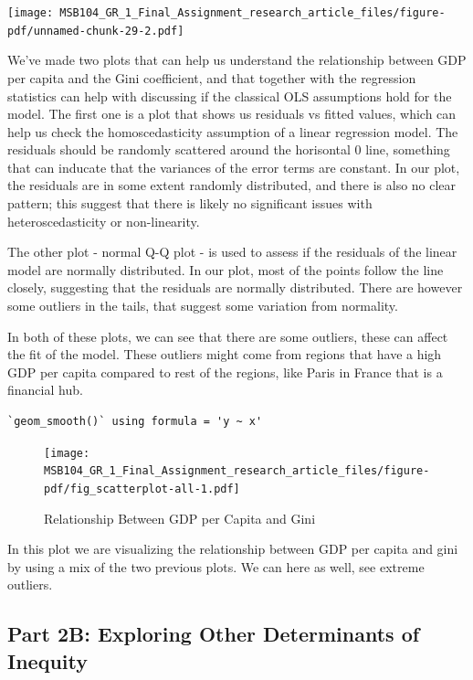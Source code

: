 \documentclass[
  a4paper,
  DIV=11,
  numbers=noendperiod]{scrartcl}
\begin{document}
\texttt{[image: MSB104\_GR\_1\_Final\_Assignment\_research\_article\_files/figure-pdf/unnamed-chunk-29-2.pdf]}

We've made two plots that can help us understand the relationship
between GDP per capita and the Gini coefficient, and that together with
the regression statistics can help with discussing if the classical OLS
assumptions hold for the model. The first one is a plot that shows us
residuals vs fitted values, which can help us check the homoscedasticity
assumption of a linear regression model. The residuals should be
randomly scattered around the horisontal 0 line, something that can
inducate that the variances of the error terms are constant. In our
plot, the residuals are in some extent randomly distributed, and there
is also no clear pattern; this suggest that there is likely no
significant issues with heteroscedasticity or non-linearity.

The other plot - normal Q-Q plot - is used to assess if the residuals of
the linear model are normally distributed. In our plot, most of the
points follow the line closely, suggesting that the residuals are
normally distributed. There are however some outliers in the tails, that
suggest some variation from normality.

In both of these plots, we can see that there are some outliers, these
can affect the fit of the model. These outliers might come from regions
that have a high GDP per capita compared to rest of the regions, like
Paris in France that is a financial hub.

\begin{verbatim}
`geom_smooth()` using formula = 'y ~ x'
\end{verbatim}

\begin{figure}

{\centering \texttt{[image: MSB104\_GR\_1\_Final\_Assignment\_research\_article\_files/figure-pdf/fig\_scatterplot-all-1.pdf]}

}

\caption{Relationship Between GDP per Capita and Gini}

\end{figure}

In this plot we are visualizing the relationship between GDP per capita
and gini by using a mix of the two previous plots. We can here as well,
see extreme outliers.

\hypertarget{part-2b-exploring-other-determinants-of-inequity}{%
\subsection{Part 2B: Exploring Other Determinants of
Inequity}\label{part-2b-exploring-other-determinants-of-inequity}}
\end{document}
